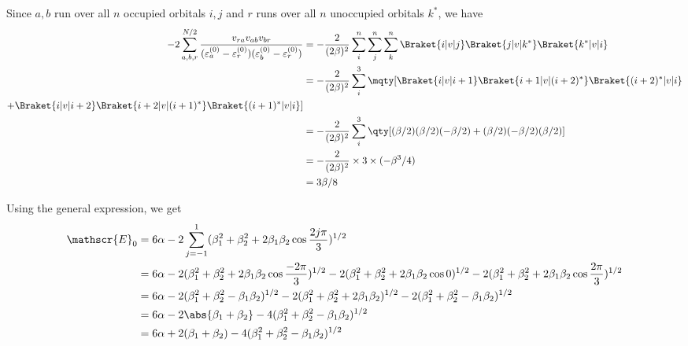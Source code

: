 \documentclass[a4paper]{article}
\begin{document}
Since $ a,b $ run over all $ n $ occupied orbitals $ i,j $ and $ r $ runs over all $ n $ unoccupied orbitals $ k^* $, we have
\begin{align}
-2\sum_{a,b,r}^{N/2} \dfrac{v_{ra}v_{ab}v_{br}}{(\varepsilon_a^{(0)} - \varepsilon_r^{(0)}) (\varepsilon_b^{(0)} - \varepsilon_r^{(0)})} 
&= -\dfrac{2}{(2\beta)^2} \sum_i^n \sum_j^n \sum_k^n \Braket{i|v|j} \Braket{j|v|k^*} \Braket{k^*|v|i} \notag\\
&= -\dfrac{2}{(2\beta)^2} \sum_i^3
\mqty[\Braket{i|v|i+1} \Braket{i+1|v|(i+2)^*} \Braket{(i+2)^*|v|i} \\
+ \Braket{i|v|i+2} \Braket{i+2|v|(i+1)^*} \Braket{(i+1)^*|v|i} ] \notag\\
&= -\dfrac{2}{(2\beta)^2} \sum_i^3 \qty[(\beta/2)(\beta/2)(-\beta/2) + (\beta/2)(-\beta/2)(\beta/2)] \notag\\
&= -\dfrac{2}{(2\beta)^2} \times 3\times (-\beta^3/4) \notag\\
&= 3\beta/8
\end{align}

Using the general expression, we get
\begin{align}
\mathscr{E}_0 &= 6\alpha - 2\sum_{j=-1}^1 (\beta_1^2 + \beta_2^2 + 2\beta_1\beta_2\cos\dfrac{2j\pi}{3})^{1/2} \notag\\
&= 6\alpha - 2(\beta_1^2 + \beta_2^2 + 2\beta_1\beta_2\cos\dfrac{-2\pi}{3})^{1/2}
- 2(\beta_1^2 + \beta_2^2 + 2\beta_1\beta_2\cos 0)^{1/2}
- 2(\beta_1^2 + \beta_2^2 + 2\beta_1\beta_2\cos\dfrac{2\pi}{3})^{1/2} 
\notag\\
&= 6\alpha - 2(\beta_1^2 + \beta_2^2 - \beta_1\beta_2)^{1/2}
- 2(\beta_1^2 + \beta_2^2 + 2\beta_1\beta_2)^{1/2}
- 2(\beta_1^2 + \beta_2^2 - \beta_1\beta_2)^{1/2} \notag\\
&= 6\alpha 
- 2\abs{\beta_1 + \beta_2}
- 4(\beta_1^2 + \beta_2^2 - \beta_1\beta_2)^{1/2} \notag\\
&= 6\alpha + 2(\beta_1 + \beta_2)
- 4(\beta_1^2 + \beta_2^2 - \beta_1\beta_2)^{1/2}
\end{align}
\end{document}
